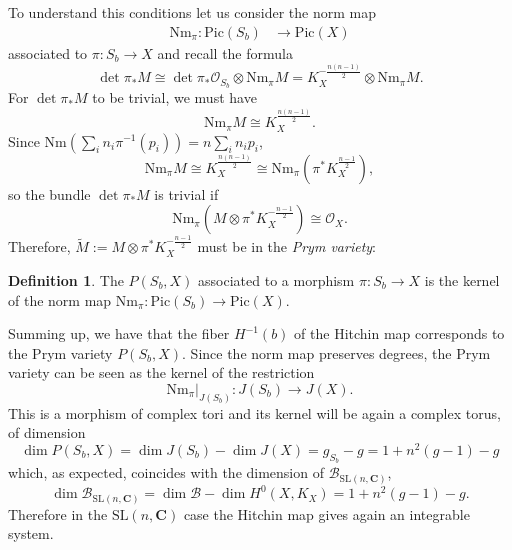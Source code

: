 \documentclass[12pt,a4paper]{book}
\theoremstyle{definition} \newtheorem{defn}[thm]{Definition}
\theoremstyle{definition} \newtheorem{ejemplo}[thm]{Example}
\theoremstyle{remark} \newtheorem{rem}[thm]{Remark}
\def\OO{\mathscr{O}}
\def\BB{\mathscr{B}}
\def\CC{\mathbf{C}}
\def\Nm{\mathrm{Nm}}
\def\SL{\mathrm{SL}}
\def\Pic{\mathrm{Pic}}
\let\emph\relax
\begin{document}
To understand this conditions let us consider the norm map
  \begin{align*}
     \Nm_\pi: \Pic(S_b)&\longrightarrow \Pic(X)
    \end{align*}
    associated to $\pi:S_b\rightarrow X$ and recall the formula
    \begin{equation*}
      \det \pi_*M \cong \det \pi_*\OO_{S_b} \otimes \Nm_\pi M=K_X^{-\frac{n(n-1)}{2}} \otimes \Nm_\pi M.
    \end{equation*}
    For $\det \pi_*M$ to be trivial, we must have
    \begin{equation*}
      \Nm_\pi M \cong K_X^{\frac{n(n-1)}{2}}.
    \end{equation*}
    Since $\Nm(\sum_i n_i\pi^{-1}(p_i))=n\sum_i n_ip_i$, 
    \begin{equation*}
      \Nm_\pi M \cong K_X^{\frac{n(n-1)}{2}} \cong \Nm_\pi\left(\pi^*K_X^{\frac{n-1}{2}}\right),
    \end{equation*}
    so the bundle $\det \pi_*M$ is trivial if
    \begin{equation*}
      \Nm_\pi \left(M\otimes \pi^*K_X^{-\frac{n-1}{2}}\right) \cong \OO_X.
    \end{equation*}
    Therefore, $\widetilde{M}:=M\otimes \pi^*K_X^{-\frac{n-1}{2}}$ must be in the \textit{Prym variety}:
    \begin{defn}
      The \emph{Prym variety} $P(S_b,X)$ associated to a morphism $\pi:S_b \rightarrow X$ is the kernel of the norm map $\Nm_\pi:\Pic(S_b) \rightarrow \Pic(X)$.
    \end{defn}
    Summing up, we have that the fiber $H^{-1}(b)$ of the Hitchin map corresponds to the Prym variety $P(S_b,X)$. Since the norm map preserves degrees, the Prym variety can be seen as the kernel of the restriction
    \begin{equation*}
      \Nm_\pi |_{J(S_b)}: J(S_b) \longrightarrow J(X).
    \end{equation*}
    This is a morphism of complex tori and its kernel will be again a complex torus, of dimension
    \begin{equation*}
      \dim P(S_b,X)= \dim J(S_b) - \dim J(X)= g_{S_b} - g = 1+n^2(g-1) -g
    \end{equation*}
    which, as expected, coincides with the dimension of $\BB_{\SL(n,\CC)}$,
    \begin{equation*}
      \dim \BB_{\SL(n,\CC)}= \dim \BB - \dim H^0(X,K_X)= 1+n^2(g-1)-g.
    \end{equation*}
    Therefore in the $\SL(n,\CC)$ case the Hitchin map gives again an integrable system.
\end{document}
